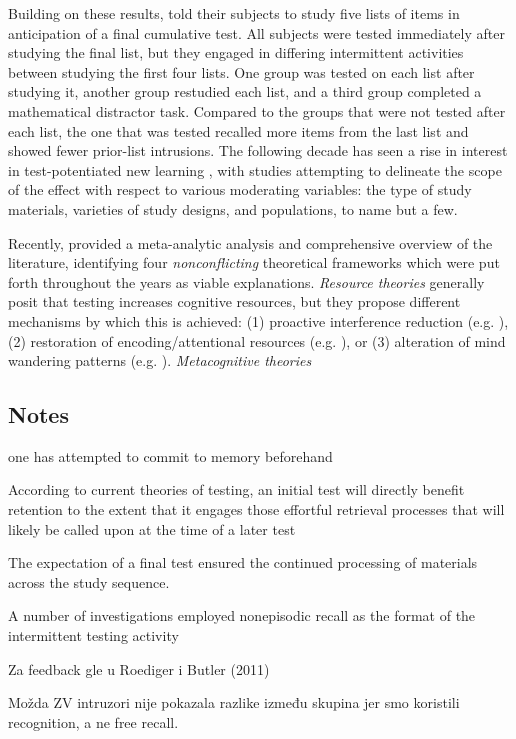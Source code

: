 \documentclass[../main.tex]{subfiles}
\begin{document}
Building on these results, \cite{szpunarTestingStudyInsulates2008} told their subjects to study five lists of items in anticipation of a final cumulative test. All subjects were tested immediately after studying the final list, but they engaged in differing intermittent activities between studying the first four lists. One group was tested on each list after studying it, another group restudied each list, and a third group completed a mathematical distractor task. Compared to the groups that were not tested after each list, the one that was tested recalled more items from the last list and showed fewer prior-list intrusions. The following decade has seen a rise in interest in test-potentiated new learning \citep{chanRetrievalPotentiatesNew2018, pastotterRetrievalPracticeEnhances2014, yangEnhancingLearningRetrieval2018}, with studies attempting to delineate the scope of the effect with respect to various moderating variables: the type of study materials, varieties of study designs, and populations, to name but a few. 

Recently, \cite{chanRetrievalPotentiatesNew2018} provided a meta-analytic analysis and comprehensive overview of the literature, identifying four \textit{nonconflicting} theoretical frameworks which were put forth throughout the years as viable explanations. \textit{Resource theories} generally posit that testing increases cognitive resources, but they propose different mechanisms by which this is achieved: (1) proactive interference reduction (e.g. \citealp{wahlheimTestingCanCounteract2015, weinsteinTestingProtectsProactive2011, szpunarTestingStudyInsulates2008, nunesTestingImprovesTrue2012}), (2) restoration of encoding/attentional resources (e.g. \citealp{pastotterRetrievalLearningFacilitates2011}), or (3) alteration of mind wandering patterns (e.g. \citealp{jingInterpolatedTestingInfluences2016,szpunarInterpolatedMemoryTests2013,szpunarMindWanderingEducation2013}). \textit{Metacognitive theories}


{
    \biblio
}

\subsection{Notes}
one has attempted to commit to memory beforehand

According to current theories of testing, an initial test will directly benefit retention to the extent that it engages those effortful retrieval processes that will likely be called upon at the time of a later test \cite{roedigeriiiPowerTestingMemory2006}

The expectation of a final test ensured the
continued processing of materials across the study sequence.


A number of investigations employed nonepisodic recall as the format of the intermittent testing activity \cite{divisRetrievalSpeedsContext2014, pastotterRetrievalLearningFacilitates2011, }

Za feedback gle u Roediger i Butler (2011)


Možda ZV intruzori nije pokazala razlike između skupina jer smo koristili recognition, a ne free recall.
\end{document}

